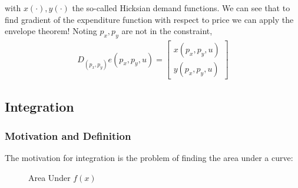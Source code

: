 \documentclass{article}
\begin{document}
with $x(\cdot), y(\cdot)$ the so-called Hicksian demand functions. We can see that to find gradient of the expenditure function with respect to price we can apply the envelope theorem! Noting $p_x, p_y$ are not in the constraint,
\begin{align*}
  D_{(p_x, p_y)} e(p_x, p_y, u)
  =
  \begin{bmatrix}
    x(p_x, p_y, u) \\ y(p_x, p_y, u)
  \end{bmatrix}
\end{align*}

\subsection{Integration}
\label{sub:integration}

\subsubsection{Motivation and Definition}
\label{ssub:motivation_and_definition}

The motivation for integration is the problem of finding the area under a curve:
\begin{figure}[!ht]
  \centering
  \caption{Area Under $f(x)$}
  \label{fig:area_under_f_x_}
\end{figure}
\end{document}
